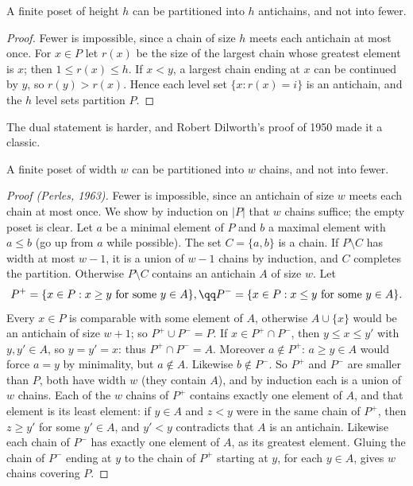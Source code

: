 \begin{theorem}[Mirsky, 1971]\label{thm:mirsky}
A finite poset of height $h$ can be partitioned into $h$ antichains, and not into fewer.
\end{theorem}
\begin{proof}
Fewer is impossible, since a chain of size $h$ meets each antichain at most once. For $x\in P$ let $r(x)$ be the size of the largest
chain whose greatest element is $x$; then $1\le r(x)\le h$. If $x<y$, a largest chain ending at $x$ can be continued by $y$, so $r(y)>r(x)$. Hence
each level set $\{x:r(x)=i\}$ is an antichain, and the $h$ level sets partition $P$.
\end{proof}

The dual statement is harder, and Robert Dilworth's proof of 1950 made it a classic.

\begin{theorem}[Dilworth, 1950]\label{thm:dilworth}
A finite poset of width $w$ can be partitioned into $w$ chains, and not into fewer.
\end{theorem}
\begin{proof}[Proof (Perles, 1963)]
Fewer is impossible, since an antichain of size $w$ meets each chain at most once. We show by induction on $|P|$ that $w$
chains suffice; the empty poset is clear. Let $a$ be a minimal element of $P$ and $b$ a maximal element with $a\le b$ (go up from $a$
while possible). The set $C=\{a,b\}$ is a chain. If $P\setminus C$ has width at most $w-1$, it is a union of $w-1$ chains by induction, and $C$
completes the partition. Otherwise $P\setminus C$ contains an antichain $A$ of size $w$. Let
\[
\begin{gathered}P^+=\{x\in P:x\ge y\text{ for some }y\in A\},\qq P^-=\{x\in P:x\le y\text{ for some }y\in A\}.\end{gathered}
\]
Every $x\in P$ is comparable with some element of $A$, otherwise $A\cup\{x\}$ would be an antichain of size $w+1$; so $P^+\cup P^-=P$. If $x\in P^+\cap P^-$,
then $y\le x\le y'$ with $y,y'\in A$, so $y=y'=x$: thus $P^+\cap P^-=A$. Moreover $a\notin P^+$: $a\ge y\in A$ would force $a=y$ by minimality, but $a\notin A$.
Likewise $b\notin P^-$. So $P^+$ and $P^-$ are smaller than $P$, both have width $w$ (they contain $A$), and by induction each is a union of $w$
chains. Each of the $w$ chains of $P^+$ contains exactly one element of $A$, and that element is its least element: if $y\in A$ and $z<y$
were in the same chain of $P^+$, then $z\ge y'$ for some $y'\in A$, and $y'<y$ contradicts that $A$ is an antichain. Likewise each chain of
$P^-$ has exactly one element of $A$, as its greatest element. Gluing the chain of $P^-$ ending at $y$ to the chain of $P^+$ starting at
$y$, for each $y\in A$, gives $w$ chains covering $P$.
\end{proof}

